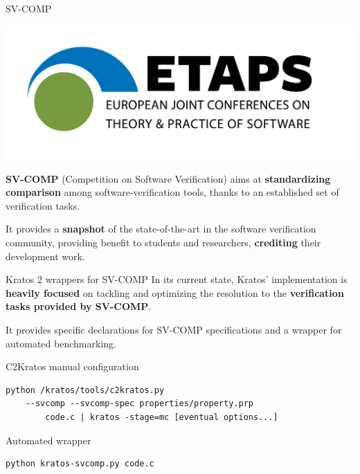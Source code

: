 \documentclass[aspectratio=1610,10.5pt]{beamer} %
\begin{document}
\begin{frame}{SV-COMP}
    \begin{center}
        \includegraphics[height=%
        0.25\textheight]{../res/logo-svcomp}
    \end{center}

    \textbf{SV-COMP} (Competition on Software Verification) aims at \textbf{standardizing comparison} among software-verification tools, thanks to an established set of verification tasks.

    \bigskip

    It provides a \textbf{snapshot} of the state-of-the-art in the software verification community, providing benefit to students and researchers, \textbf{crediting} their development work.
\end{frame}

\begin{frame}[fragile]{Kratos 2 wrappers for SV-COMP}
    In its current state, Kratos' implementation is \textbf{heavily focused} on tackling and optimizing the resolution to the \textbf{verification tasks provided by SV-COMP}.

    \bigskip

    It provides specific declarations for SV-COMP specifications and a wrapper for automated benchmarking.

    \begin{block}{C2Kratos manual configuration}
            \begin{verbatim}
python /kratos/tools/c2kratos.py
    --svcomp --svcomp-spec properties/property.prp
        code.c | kratos -stage=mc [eventual options...]
            \end{verbatim}
    \end{block}

    \pause

    \begin{block}{Automated wrapper}
            \begin{verbatim}
python kratos-svcomp.py code.c
            \end{verbatim}
    \end{block}
\end{frame}
\end{document}
